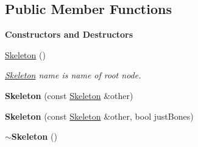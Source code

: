 \subsection*{Public Member Functions}
\begin{Indent}\textbf{ Constructors and Destructors}\par
\begin{DoxyCompactItemize}
\item 
\mbox{\label{classrev_1_1_skeleton_acdd083c8975288192d3a0dd56c2734f4}} 
\mbox{\hyperlink{classrev_1_1_skeleton_acdd083c8975288192d3a0dd56c2734f4}{Skeleton}} ()
\begin{DoxyCompactList}\small\item\em \mbox{\hyperlink{classrev_1_1_skeleton}{Skeleton}} name is name of root node. \end{DoxyCompactList}\item 
\mbox{\label{classrev_1_1_skeleton_a92d90c515cad2c0f0b5685383af564e7}} 
{\bfseries Skeleton} (const \mbox{\hyperlink{classrev_1_1_skeleton}{Skeleton}} \&other)
\item 
\mbox{\label{classrev_1_1_skeleton_a8b919efbe5ab9c7896a699170d5ce46d}} 
{\bfseries Skeleton} (const \mbox{\hyperlink{classrev_1_1_skeleton}{Skeleton}} \&other, bool just\+Bones)
\item 
\mbox{\label{classrev_1_1_skeleton_a2758b38fe7bf7688853a98976bcb6157}} 
{\bfseries $\sim$\+Skeleton} ()
\end{DoxyCompactItemize}
\end{Indent}
